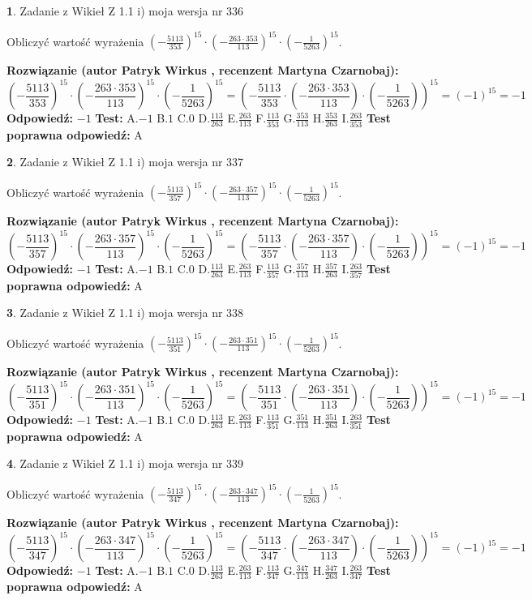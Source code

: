 \documentclass[12pt, a4paper]{article}
\theoremstyle{definition} %
\newtheorem{zad}{}
\newcommand{\zadStart}[1]{\begin{zad}#1\newline}
\newcommand{\zadStop}{\end{zad}}
\newcommand{\rozwStart}[2]{\noindent \textbf{Rozwiązanie (autor #1 , recenzent #2): }\newline}
\newcommand{\rozwStop}{\newline}
\newcommand{\odpStart}{\noindent \textbf{Odpowiedź:}\newline}
\newcommand{\odpStop}{\newline}
\newcommand{\testStart}{\noindent \textbf{Test:}\newline}
\newcommand{\testStop}{\newline}
\newcommand{\kluczStart}{\noindent \textbf{Test poprawna odpowiedź:}\newline}
\newcommand{\kluczStop}{\newline}
\begin{document}
\zadStart{Zadanie z Wikieł Z 1.1 i) moja wersja nr 336}

Obliczyć wartość wyrażenia $(-\frac{5113}{353})^{15} \cdot (-\frac{263 \cdot 353}{113})^{15} \cdot (-\frac{1}{5263})^{15}$.
\zadStop
\rozwStart{Patryk Wirkus}{Martyna Czarnobaj}
$$(-\frac{5113}{353})^{15} \cdot (-\frac{263 \cdot 353}{113})^{15} \cdot (-\frac{1}{5263})^{15} = (-\frac{5113}{353} \cdot (-\frac{263 \cdot 353}{113}) \cdot (-\frac{1}{5263}))^{15} = (-1)^{15} = -1$$
\rozwStop
\odpStart
$-1$
\odpStop
\testStart
A.$-1$ B.$1$ C.$0$ D.$\frac{113}{263}$ E.$\frac{263}{113}$
F.$\frac{113}{353}$ G.$\frac{353}{113}$
H.$\frac{353}{263}$
I.$\frac{263}{353}$
\testStop
\kluczStart
A
\kluczStop



\zadStart{Zadanie z Wikieł Z 1.1 i) moja wersja nr 337}

Obliczyć wartość wyrażenia $(-\frac{5113}{357})^{15} \cdot (-\frac{263 \cdot 357}{113})^{15} \cdot (-\frac{1}{5263})^{15}$.
\zadStop
\rozwStart{Patryk Wirkus}{Martyna Czarnobaj}
$$(-\frac{5113}{357})^{15} \cdot (-\frac{263 \cdot 357}{113})^{15} \cdot (-\frac{1}{5263})^{15} = (-\frac{5113}{357} \cdot (-\frac{263 \cdot 357}{113}) \cdot (-\frac{1}{5263}))^{15} = (-1)^{15} = -1$$
\rozwStop
\odpStart
$-1$
\odpStop
\testStart
A.$-1$ B.$1$ C.$0$ D.$\frac{113}{263}$ E.$\frac{263}{113}$
F.$\frac{113}{357}$ G.$\frac{357}{113}$
H.$\frac{357}{263}$
I.$\frac{263}{357}$
\testStop
\kluczStart
A
\kluczStop



\zadStart{Zadanie z Wikieł Z 1.1 i) moja wersja nr 338}

Obliczyć wartość wyrażenia $(-\frac{5113}{351})^{15} \cdot (-\frac{263 \cdot 351}{113})^{15} \cdot (-\frac{1}{5263})^{15}$.
\zadStop
\rozwStart{Patryk Wirkus}{Martyna Czarnobaj}
$$(-\frac{5113}{351})^{15} \cdot (-\frac{263 \cdot 351}{113})^{15} \cdot (-\frac{1}{5263})^{15} = (-\frac{5113}{351} \cdot (-\frac{263 \cdot 351}{113}) \cdot (-\frac{1}{5263}))^{15} = (-1)^{15} = -1$$
\rozwStop
\odpStart
$-1$
\odpStop
\testStart
A.$-1$ B.$1$ C.$0$ D.$\frac{113}{263}$ E.$\frac{263}{113}$
F.$\frac{113}{351}$ G.$\frac{351}{113}$
H.$\frac{351}{263}$
I.$\frac{263}{351}$
\testStop
\kluczStart
A
\kluczStop



\zadStart{Zadanie z Wikieł Z 1.1 i) moja wersja nr 339}

Obliczyć wartość wyrażenia $(-\frac{5113}{347})^{15} \cdot (-\frac{263 \cdot 347}{113})^{15} \cdot (-\frac{1}{5263})^{15}$.
\zadStop
\rozwStart{Patryk Wirkus}{Martyna Czarnobaj}
$$(-\frac{5113}{347})^{15} \cdot (-\frac{263 \cdot 347}{113})^{15} \cdot (-\frac{1}{5263})^{15} = (-\frac{5113}{347} \cdot (-\frac{263 \cdot 347}{113}) \cdot (-\frac{1}{5263}))^{15} = (-1)^{15} = -1$$
\rozwStop
\odpStart
$-1$
\odpStop
\testStart
A.$-1$ B.$1$ C.$0$ D.$\frac{113}{263}$ E.$\frac{263}{113}$
F.$\frac{113}{347}$ G.$\frac{347}{113}$
H.$\frac{347}{263}$
I.$\frac{263}{347}$
\testStop
\kluczStart
A
\kluczStop
\end{document}
